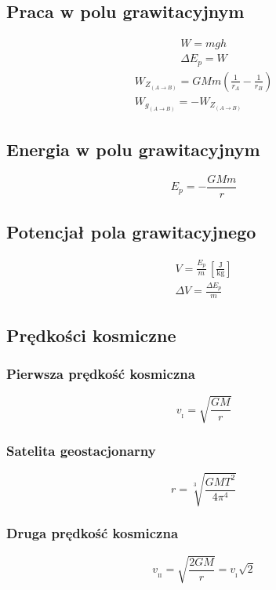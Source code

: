 \documentclass{article}
\numberwithin{equation}{section}
\newcommand{\unit}[1]{\, \left[\mathrm{#1}\right]}
\begin{document}
    \subsection{Praca w polu grawitacyjnym}
      \begin{gather}
        W = mgh\\
        \Delta E_p = W
      \end{gather}
      \begin{gather}
        W_{Z_{(A\rightarrow B)}} = GMm\left(\frac{1}{r_A} - \frac{1}{r_B}\right)\\
        W_{g_{(A\rightarrow B)}} = -W_{Z_{(A\rightarrow B)}}
      \end{gather}
    \subsection{Energia w polu grawitacyjnym}
      \begin{equation}
        E_p = -\frac{GMm}{r}
      \end{equation}
    \subsection{Potencjał pola grawitacyjnego}
      \begin{gather}
        V = \frac{E_p}{m} \unit{\frac{J}{kg}}\\
        \Delta V = \frac{\Delta E_p}{m}
      \end{gather}
    \subsection{Prędkości kosmiczne}
      \subsubsection{Pierwsza prędkość kosmiczna}
        \begin{equation}
          v_{{}_\mathrm{I}} = \sqrt{\frac{GM}{r}}
        \end{equation}
      \subsubsection{Satelita geostacjonarny}
        \begin{equation}
          r = \sqrt[3]{\frac{GMT^2}{4\pi^4}}
        \end{equation}
      \subsubsection{Druga prędkość kosmiczna}
        \begin{equation}
          v_{{}_\mathrm{II}} = \sqrt{\frac{2GM}{r}} = v_{{}_\mathrm{I}}\sqrt{2}
        \end{equation}
\end{document}
